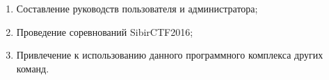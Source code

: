 \begin{enumerate}
\item Составление руководств пользователя и администратора;
\item Проведение соревнований SibirCTF2016;
\item Привлечение к использованию данного программного комплекса других команд.
\end{enumerate}